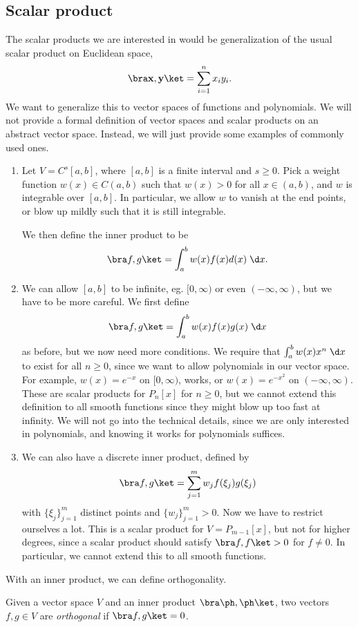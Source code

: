 \documentclass[a4paper]{article}
\begin{document}
\subsection{Scalar product}
The scalar products we are interested in would be generalization of the usual scalar product on Euclidean space,
\[
  \bra \mathbf{x}, \mathbf{y}\ket = \sum_{i = 1}^n x_i y_i.
\]
We want to generalize this to vector spaces of functions and polynomials. We will not provide a formal definition of vector spaces and scalar products on an abstract vector space. Instead, we will just provide some examples of commonly used ones.
\begin{eg}\leavevmode
  \begin{enumerate}
    \item Let $V = C^s[a, b]$, where $[a, b]$ is a finite interval and $s \geq 0$. Pick a weight function $w(x) \in C(a, b)$ such that $w(x) > 0$ for all $x \in (a, b)$, and $w$ is integrable over $[a, b]$. In particular, we allow $w$ to vanish at the end points, or blow up mildly such that it is still integrable.

      We then define the inner product to be
      \[
        \bra f, g\ket = \int_a^b w(x) f(x) d(x)\;\d x.
      \]
    \item We can allow $[a, b]$ to be infinite, eg. $[0, \infty)$ or even $(-\infty, \infty)$, but we have to be more careful. We first define
      \[
        \bra f, g\ket = \int_a^b w(x) f(x) g(x) \;\d x
      \]
      as before, but we now need more conditions. We require that $\int_a^b w(x) x^n\;\d x$ to exist for all $n \geq 0$, since we want to allow polynomials in our vector space. For example, $w(x) = e^{-x}$ on $[0, \infty)$, works, or $w(x) = e^{-x^2}$ on $(-\infty, \infty)$. These are scalar products for $P_n[x]$ for $n \geq 0$, but we cannot extend this definition to all smooth functions since they might blow up too fast at infinity. We will not go into the technical details, since we are only interested in polynomials, and knowing it works for polynomials suffices.
    \item We can also have a discrete inner product, defined by
      \[
        \bra f, g\ket = \sum_{j = 1}^m w_j f(\xi_j) g(\xi_j)
      \]
      with $\{\xi_j\}_{j = 1}^m$ distinct points and $\{w_j\}_{j = 1}^m > 0$. Now we have to restrict ourselves a lot. This is a scalar product for $V = P_{m - 1}[x]$, but not for higher degrees, since a scalar product should satisfy $\bra f, f \ket > 0$ for $f \not= 0$. In particular, we cannot extend this to all smooth functions.
  \end{enumerate}
\end{eg}
With an inner product, we can define orthogonality.
\begin{defi}[Orthogonalilty]
  Given a vector space $V$ and an inner product $\bra \ph, \ph\ket$, two vectors $f, g \in V$ are \emph{orthogonal} if $\bra f, g\ket = 0$.
\end{defi}
\end{document}
